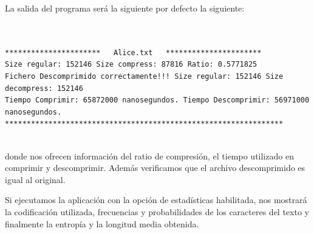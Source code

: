 \documentclass{article}
\begin{document}
La salida del programa será la siguiente por defecto la siguiente:
\footnotesize
\begin{verbatim}
 
 
********************** 	 Alice.txt 	 **********************
Size regular: 152146 Size compress: 87816 Ratio: 0.5771825
Fichero Descomprimido correctamente!!! Size regular: 152146 Size decompress: 152146
Tiempo Comprimir: 65872000 nanosegundos. Tiempo Descomprimir: 56971000 nanosegundos.
****************************************************************
 
\end{verbatim}
\normalsize
donde nos ofrecen información del ratio de compresión, el tiempo utilizado en comprimir y descomprimir. Además verificamos que el archivo descomprimido es igual al original. 

Si ejecutamos la aplicación con la opción de estadísticas habilitada, nos mostrará la codificación utilizada, frecuencias y probabilidades de los caracteres del texto y finalmente la entropía y la longitud media obtenida.
\end{document}
